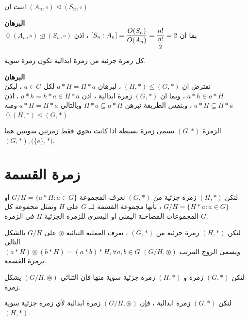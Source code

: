  \begin{example}
 	اثبت ان 
 	$(A_n, \circ) \trianglelefteq (S_n, \circ)$ 
 \end{example}
 \noindent
 \textbf{البرهان}\\
 \noindent
 بما ان 
 $[S_n : A_n] = \dfrac{O(S_n)}{O(A_n) } = \dfrac{n!}{\mfrac{n!}{2}} = 2$ ، 
 اذن  	$(A_n, \circ) \trianglelefteq (S_n, \circ)$ \qed
 
 \begin{theorem}
 	كل زمرة جزئية من زمرة ابدالية تكون زمرة سوية.
 \end{theorem}
 \noindent
 \textbf{البرهان}\\
 \noindent
 نفترض ان $(H, *)\leq (G, *)$ ،
 لبرهان $a*H = H*a$ لكل $a\in G$ ،
 ليكن $a*h \in a*H$ ، وبما ان $(G, *)$ زمرة ابدالية ، اذن $a*h = h*a \in H*a$ ،
  اذن $a*H\subseteq H*a$ ، وبنفس الطريقة نبرهن $H*a\subseteq a*H$ وبالتالي $a*H=H*a$ ومنه 
  $(H, *) \trianglelefteq (G, *)$.\qed
  
  \begin{definition}
  	الزمرة $(G, *)$ تسمى زمرة بسيطة اذا كانت تحوي فقط زمرتين سويتين هما 
  	$(G, *) , \big(\{e\}, *\big)$.
  \end{definition}
  
  \newpage
  
  \section{زمرة القسمة}
  \begin{definition}
  	لتكن $(H, *)$ زمرة جزئية من $(G, *)$ نعرف المجموعة
  $G/H = \{a*H : a\in G\}$  او $ G/H = \{H*a : a\in G\}$ ، بأنها مجموعة القسمة لــ $G$ على $H$ وتمثل مجموعة كل المجموعات المصاحبة اليمنى او اليسرى للزمرة الجزئية $H$ في الزمرة $G$.
  \end{definition}
  
  \begin{definition}
  	لتكن $(H, *)$ زمرة جزئية من $(G , *)$ ، نعرف العملية الثنائية $\circledast$ على $G/H$ بالشكل التالي\\
  	$
  	(a*H)\circledast (b*H) = (a*b) *H, \forall a, b\in G
  	$
  	ويسمى الزوج المرتب $(G/H, \circledast)$ بزمرة القسمة.
  \end{definition}
  
  \begin{theorem}
  	لتكن $(G, *)$ زمرة و $(H, *)$ زمرة جزئية سوية منها فإن الثنائي $(G/H, \circledast)$ يشكل زمرة.
  \end{theorem}
  
  \begin{theorem}
  	لتكن $(G, *)$ زمرة ابدالية ، فإن $(G/H, \circledast)$ زمرة ابدالية لأي زمرة جزئية سوية $(H, *)$.
  \end{theorem}
  
